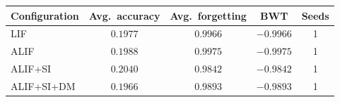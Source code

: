 \begin{tabular}{@{}lcccc@{}}
\toprule
\textbf{Configuration} & \textbf{Avg.\ accuracy} & \textbf{Avg.\ forgetting} & \textbf{BWT} & \textbf{Seeds} \\
\midrule
LIF & $0.1977$ & $0.9966$ & $-0.9966$ & 1 \\
ALIF & $0.1988$ & $0.9975$ & $-0.9975$ & 1 \\
ALIF+SI & $0.2040$ & $0.9842$ & $-0.9842$ & 1 \\
ALIF+SI+DM & $0.1966$ & $0.9893$ & $-0.9893$ & 1 \\
\bottomrule
\end{tabular}
